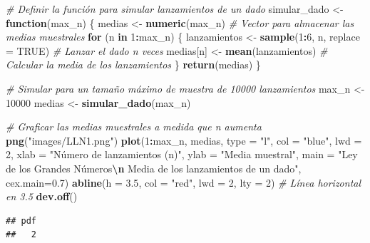 \documentclass[
]{article}
\newenvironment{Shaded}{\begin{snugshade}}{\end{snugshade}}
\newcommand{\AttributeTok}[1]{\textcolor[rgb]{0.13,0.29,0.53}{#1}}
\newcommand{\CommentTok}[1]{\textcolor[rgb]{0.56,0.35,0.01}{\textit{#1}}}
\newcommand{\ConstantTok}[1]{\textcolor[rgb]{0.56,0.35,0.01}{#1}}
\newcommand{\ControlFlowTok}[1]{\textcolor[rgb]{0.13,0.29,0.53}{\textbf{#1}}}
\newcommand{\DecValTok}[1]{\textcolor[rgb]{0.00,0.00,0.81}{#1}}
\newcommand{\FloatTok}[1]{\textcolor[rgb]{0.00,0.00,0.81}{#1}}
\newcommand{\FunctionTok}[1]{\textcolor[rgb]{0.13,0.29,0.53}{\textbf{#1}}}
\newcommand{\NormalTok}[1]{#1}
\newcommand{\OtherTok}[1]{\textcolor[rgb]{0.56,0.35,0.01}{#1}}
\newcommand{\SpecialCharTok}[1]{\textcolor[rgb]{0.81,0.36,0.00}{\textbf{#1}}}
\newcommand{\StringTok}[1]{\textcolor[rgb]{0.31,0.60,0.02}{#1}}
\begin{document}
\begin{Shaded}
\begin{Highlighting}[]
\CommentTok{\# Definir la función para simular lanzamientos de un dado}
\NormalTok{simular\_dado }\OtherTok{\textless{}{-}} \ControlFlowTok{function}\NormalTok{(max\_n) \{}
\NormalTok{  medias }\OtherTok{\textless{}{-}} \FunctionTok{numeric}\NormalTok{(max\_n)  }\CommentTok{\# Vector para almacenar las medias muestrales}
  \ControlFlowTok{for}\NormalTok{ (n }\ControlFlowTok{in} \DecValTok{1}\SpecialCharTok{:}\NormalTok{max\_n) \{}
\NormalTok{    lanzamientos }\OtherTok{\textless{}{-}} \FunctionTok{sample}\NormalTok{(}\DecValTok{1}\SpecialCharTok{:}\DecValTok{6}\NormalTok{, n, }\AttributeTok{replace =} \ConstantTok{TRUE}\NormalTok{)  }\CommentTok{\# Lanzar el dado n veces}
\NormalTok{    medias[n] }\OtherTok{\textless{}{-}} \FunctionTok{mean}\NormalTok{(lanzamientos)  }\CommentTok{\# Calcular la media de los lanzamientos}
\NormalTok{  \}}
  \FunctionTok{return}\NormalTok{(medias)}
\NormalTok{\}}

\CommentTok{\# Simular para un tamaño máximo de muestra de 10000 lanzamientos}
\NormalTok{max\_n }\OtherTok{\textless{}{-}} \DecValTok{10000}
\NormalTok{medias }\OtherTok{\textless{}{-}} \FunctionTok{simular\_dado}\NormalTok{(max\_n)}

\CommentTok{\# Graficar las medias muestrales a medida que n aumenta}
\FunctionTok{png}\NormalTok{(}\StringTok{"images/LLN1.png"}\NormalTok{)}
\FunctionTok{plot}\NormalTok{(}\DecValTok{1}\SpecialCharTok{:}\NormalTok{max\_n, medias, }\AttributeTok{type =} \StringTok{"l"}\NormalTok{, }\AttributeTok{col =} \StringTok{"blue"}\NormalTok{, }\AttributeTok{lwd =} \DecValTok{2}\NormalTok{,}
     \AttributeTok{xlab =} \StringTok{"Número de lanzamientos (n)"}\NormalTok{, }\AttributeTok{ylab =} \StringTok{"Media muestral"}\NormalTok{,}
     \AttributeTok{main =} \StringTok{"Ley de los Grandes Números}\SpecialCharTok{\textbackslash{}n}\StringTok{ Media de los lanzamientos de un dado"}\NormalTok{, }\AttributeTok{cex.main=}\FloatTok{0.7}\NormalTok{)}
\FunctionTok{abline}\NormalTok{(}\AttributeTok{h =} \FloatTok{3.5}\NormalTok{, }\AttributeTok{col =} \StringTok{"red"}\NormalTok{, }\AttributeTok{lwd =} \DecValTok{2}\NormalTok{, }\AttributeTok{lty =} \DecValTok{2}\NormalTok{)  }\CommentTok{\# Línea horizontal en 3.5}
\FunctionTok{dev.off}\NormalTok{()}
\end{Highlighting}
\end{Shaded}

\begin{verbatim}
## pdf 
##   2
\end{verbatim}
\end{document}
